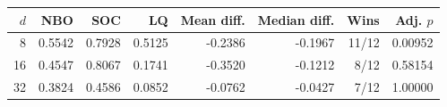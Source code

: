 \begin{tabular}{rrrrrrrr}
\toprule
$d$ & NBO & SOC & LQ & Mean diff. & Median diff. & Wins & Adj. $p$ \\
\midrule
8 & 0.5542 & 0.7928 & 0.5125 & -0.2386 & -0.1967 & 11/12 & 0.00952 \\
16 & 0.4547 & 0.8067 & 0.1741 & -0.3520 & -0.1212 & 8/12 & 0.58154 \\
32 & 0.3824 & 0.4586 & 0.0852 & -0.0762 & -0.0427 & 7/12 & 1.00000 \\
\bottomrule
\end{tabular}
